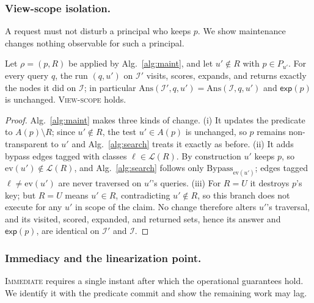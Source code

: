 \documentclass[sigconf, nonacm, review]{acmart}
\begin{document}
\subsubsection{View-scope isolation.}
\label{app:correct-scope}
A request must not disturb a principal who keeps $p$. We show maintenance
changes nothing observable for such a principal.

\begin{lemma}
\label{lem:viewscope}
Let $\rho=(p,R)$ be applied by Alg.~\ref{alg:maint}, and let $u'\notin R$ with
$p\in P_{u'}$. For every query $q$, the run $(q,u')$ on $\mathcal{I}'$ visits,
scores, expands, and returns exactly the nodes it did on $\mathcal{I}$;
in particular $\mathrm{Ans}(\mathcal{I}',q,u')=\mathrm{Ans}(\mathcal{I},q,u')$
and $\mathsf{exp}(p)$ is unchanged. \textsc{View-scope} holds.
\end{lemma}
\begin{proof}
Alg.~\ref{alg:maint} makes three kinds of change. (i) It updates the predicate
to $A(p)\setminus R$; since $u'\notin R$, the test $u'\in A(p)$ is unchanged,
so $p$ remains non-transparent to $u'$ and Alg.~\ref{alg:search} treats it
exactly as before. (ii) It adds bypass edges tagged with classes
$\ell\in\mathcal{L}(R)$. By construction $u'$ keeps $p$, so
$\mathrm{ev}(u')\notin\mathcal{L}(R)$, and Alg.~\ref{alg:search} follows only
$\mathrm{Bypass}_{\mathrm{ev}(u')}$; edges tagged $\ell\neq\mathrm{ev}(u')$ are
never traversed on $u'$'s queries. (iii) For $R=U$ it destroys $p$'s key; but
$R=U$ means $u'\in R$, contradicting $u'\notin R$, so this branch does not
execute for any $u'$ in scope of the claim. No change therefore alters $u'$'s
traversal, and its visited, scored, expanded, and returned sets, hence its
answer and $\mathsf{exp}(p)$, are identical on $\mathcal{I}'$ and
$\mathcal{I}$.
\end{proof}

\subsubsection{Immediacy and the linearization point.}
\label{app:correct-imm}
\textsc{Immediate} requires a single instant after which the operational
guarantees hold. We identify it with the predicate commit and show the
remaining work may lag.
\end{document}
